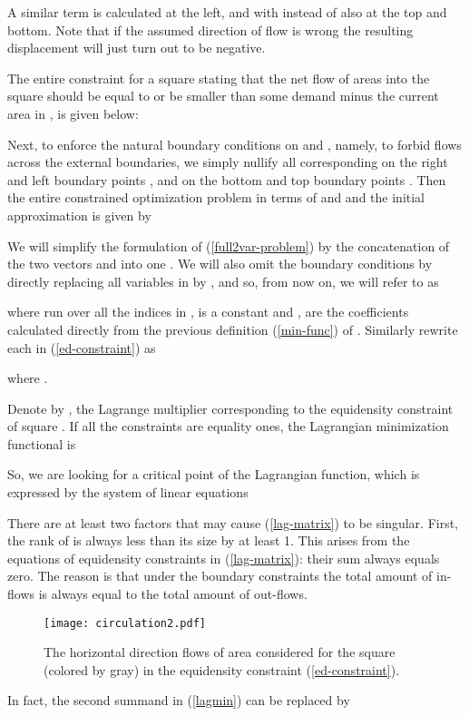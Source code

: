\documentclass[final]{siamltex}
\begin{document}
A similar term is calculated at the left, and with  instead of
 also at the top and bottom. Note that if the assumed direction
of flow is wrong the resulting displacement will just turn out to
be negative.
\par The entire constraint for a square  stating that the net flow of areas into the square
 should be equal to or be smaller than some demand  minus the current area in , is given below:

Next, to enforce the natural boundary conditions on  and ,
namely, to forbid flows across the external boundaries, we simply
nullify all corresponding  on the right and left boundary
points , and  on the bottom and top boundary points
.
Then the entire constrained optimization problem in terms of 
and  and the initial approximation  is
given by

We will simplify the formulation of (\ref{full2var-problem}) by
the concatenation of the two vectors  and  into one
. We
will also omit the boundary conditions by directly replacing all
variables in  by , and so, from
now on, we will refer to  as

where  run over all the indices in ,  is a constant and ,
 are the coefficients calculated directly from the previous
definition (\ref{min-func}) of . Similarly rewrite
each  in (\ref{ed-constraint}) as

where .
\par Denote by ,  the Lagrange multiplier corresponding to the equidensity constraint
of square .
If all the constraints are equality ones, the
Lagrangian minimization functional is

So, we are looking for a critical point of the Lagrangian function, which is expressed by the system of linear
equations

There are at least two factors that may cause (\ref{lag-matrix})
to be singular. First, the rank of  is
always less than its size by at least 1. This arises from the
equations of equidensity constraints in (\ref{lag-matrix}): their
sum always equals zero. The reason is that under the
boundary constraints the total amount of in-flows is always equal
to the total amount of out-flows.
\begin{figure}[h]
\vbox{\center\texttt{[image: circulation2.pdf]}}
\caption{The horizontal direction flows of area considered for the
square  (colored by gray) in the equidensity constraint
(\ref{ed-constraint}).}\label{circul-fig}
\end{figure}
In fact, the second summand in (\ref{lagmin})
can be replaced by
\end{document}
